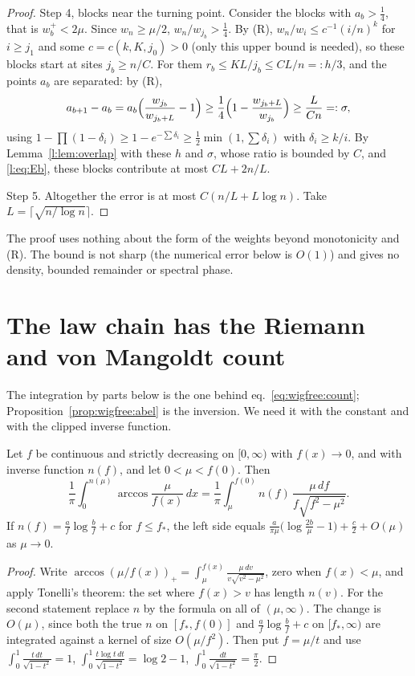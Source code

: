 \begin{proof}
Step 4, blocks near the turning point. Consider the blocks with $a_b>\frac14$, that is $w_b^+<2\mu$. Since $w_n\ge\mu/2$, $w_n/w_{j_b}>\frac14$. By (R), $w_n/w_i\le c^{-1}(i/n)^k$ for $i\ge j_1$ and some $c=c(k,K,j_0)>0$ (only this upper bound is needed), so these blocks start at sites $j_b\ge n/C$. For them $r_b\le KL/j_b\le CL/n=:h/3$, and the points $a_b$ are separated: by (R),
\[
a_{b+1}-a_b=a_b\Bigl(\frac{w_{j_b}}{w_{j_b+L}}-1\Bigr)\ge\frac14\Bigl(1-\frac{w_{j_b+L}}{w_{j_b}}\Bigr)\ge\frac{L}{Cn}=:\sigma ,
\]
using $1-\prod(1-\delta_i)\ge1-e^{-\sum\delta_i}\ge\frac12\min(1,\sum\delta_i)$ with $\delta_i\ge k/i$. By Lemma~\ref{l:lem:overlap} with these $h$ and $\sigma$, whose ratio is bounded by $C$, and \eqref{l:eq:Eb}, these blocks contribute at most $CL+2n/L$.

Step 5. Altogether the error is at most $C(n/L+L\log n)$. Take $L=\lceil\sqrt{n/\log n}\rceil$.
\end{proof}

\begin{remark}
The proof uses nothing about the form of the weights beyond monotonicity and (R). The bound is not sharp (the numerical error below is $O(1)$) and gives no density, bounded remainder or spectral phase.
\end{remark}

\section{The law chain has the Riemann and von Mangoldt count}

The integration by parts below is the one behind eq.~\eqref{eq:wigfree:count}; Proposition~\ref{prop:wigfree:abel} is the inversion. We need it with the constant and with the clipped inverse function.

\begin{lemma}\label{l:lem:abel}
Let $f$ be continuous and strictly decreasing on $[0,\infty)$ with $f(x)\to0$, and with inverse function $n(f)$, and let $0<\mu<f(0)$. Then
\[
\frac1\pi\int_0^{n(\mu)}\arccos\frac{\mu}{f(x)}\,dx=\frac1\pi\int_\mu^{f(0)}n(f)\,\frac{\mu\,df}{f\sqrt{f^2-\mu^2}} .
\]
If $n(f)=\frac af\log\frac bf+c$ for $f\le f_*$, the left side equals $\frac a{\pi\mu}\bigl(\log\frac{2b}\mu-1\bigr)+\frac c2+O(\mu)$ as $\mu\to0$.
\end{lemma}

\begin{proof}
Write $\arccos(\mu/f(x))_+=\int_\mu^{f(x)}\frac{\mu\,dv}{v\sqrt{v^2-\mu^2}}$, zero when $f(x)<\mu$, and apply Tonelli's theorem: the set where $f(x)>v$ has length $n(v)$. For the second statement replace $n$ by the formula on all of $(\mu,\infty)$. The change is $O(\mu)$, since both the true $n$ on $[f_*,f(0)]$ and $\frac af\log\frac bf+c$ on $[f_*,\infty)$ are integrated against a kernel of size $O(\mu/f^2)$. Then put $f=\mu/t$ and use $\int_0^1\frac{t\,dt}{\sqrt{1-t^2}}=1$, $\int_0^1\frac{t\log t\,dt}{\sqrt{1-t^2}}=\log2-1$, $\int_0^1\frac{dt}{\sqrt{1-t^2}}=\frac\pi2$.
\end{proof}

